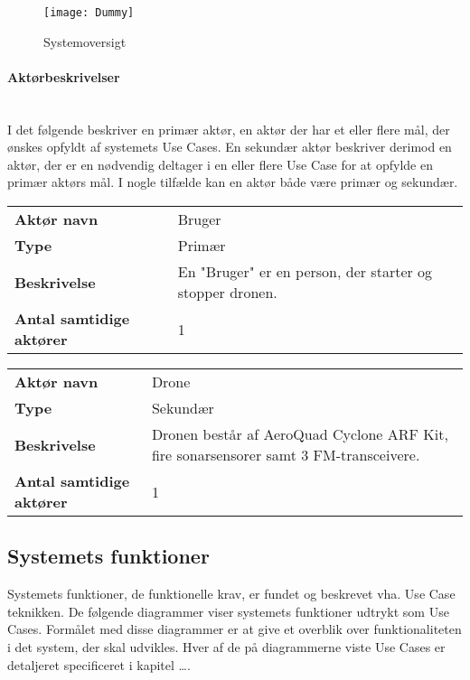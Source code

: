 \documentclass[Main]{subfiles}
\begin{document}
\begin{figure}[hbtp]
\centering
\texttt{[image: Dummy]}
\caption{Systemoversigt }
\label{Fig:Aktor-oversigt}
\end{figure}


\paragraph{Aktørbeskrivelser}\mbox{} \\%
I det følgende beskriver en primær aktør, en aktør der har et eller flere mål, der ønskes opfyldt af systemets Use Cases. 
En sekundær aktør beskriver derimod en aktør, der er en nødvendig deltager i en eller flere Use Case for at opfylde en primær aktørs mål. 
I nogle tilfælde kan en  aktør både være primær og sekundær.

\begin{longtable}{p{}|p{}}
\hline
\textbf{Aktør navn}  				& Bruger \\
\textbf{Type} 						& Primær \\
\textbf{Beskrivelse} 				& En "Bruger" er en person, der starter og stopper dronen. \\
\textbf{Antal samtidige aktører} 	& 1 \\
\hline
\end{longtable}

\begin{longtable}{p{}|p{}}
\hline
\textbf{Aktør navn}  				& Drone \\
\textbf{Type} 						& Sekundær \\
\textbf{Beskrivelse} 				& Dronen består af AeroQuad Cyclone ARF Kit, fire sonarsensorer samt 3 FM-transceivere. \\
\textbf{Antal samtidige aktører} 	& 1 \\
\hline
\end{longtable}


\subsection{Systemets funktioner}
Systemets funktioner, de funktionelle krav, er fundet og beskrevet vha. Use Case teknikken. 
De følgende diagrammer viser systemets funktioner udtrykt som Use Cases. 
Formålet med disse diagrammer er at give et overblik over funktionaliteten i det system, der skal udvikles. 
Hver af de på diagrammerne viste Use Cases er detaljeret specificeret i kapitel \dots {}.
\end{document}
